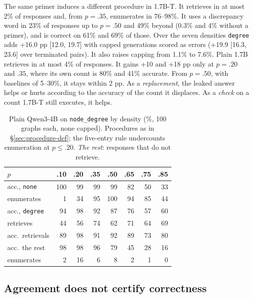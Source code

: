 \documentclass[11pt]{article}
\newcommand{\task}[1]{\texttt{#1}}
\newcommand{\cond}[1]{\texttt{#1}}
\begin{document}
The same primer induces a different procedure in 1.7B-T. It retrieves in at
most 2\% of responses and, from $p{=}.35$, enumerates in 76--98\%. It uses a
discrepancy word in 23\% of responses up to $p{=}.50$ and 49\% beyond (0.3\%
and 4\% without a primer), and is correct on 61\% and 69\% of those. Over the
seven densities \cond{degree} adds +16.0 pp [12.0, 19.7] with capped
generations scored as errors (+19.9 [16.3, 23.6] over terminated pairs). It
also raises capping from 1.1\% to 7.6\%. Plain 1.7B retrieves in at most 4\%
of responses. It gains +10 and +18 pp only at $p{=}.20$ and $.35$, where its
own count is 80\% and 41\% accurate. From $p{=}.50$, with baselines of
5--30\%, it stays within 2 pp. As a \emph{replacement}, the leaked answer
helps or hurts according to the accuracy of the count it displaces. As a
\emph{check} on a count 1.7B-T still executes, it helps.

\begin{table}[t]
\centering
\small
\setlength{\tabcolsep}{2.6pt}
\begin{tabular}{lrrrrrrr}
\toprule
$p$ & .10 & .20 & .35 & .50 & .65 & .75 & .85 \\
\midrule
acc., \cond{none}      & 100 & 99 & 99 & 99 & 82 & 50 & 33 \\
\quad enumerates       & 1 & 34 & 95 & 100 & 94 & 85 & 44 \\
acc., \cond{degree}    & 94 & 98 & 92 & 87 & 76 & 57 & 60 \\
\quad retrieves        & 44 & 56 & 74 & 62 & 71 & 64 & 69 \\
\quad acc.\ retrievals & 89 & 98 & 91 & 92 & 89 & 73 & 80 \\
\quad acc.\ the rest   & 98 & 98 & 96 & 79 & 45 & 28 & 16 \\
\quad enumerates       & 2 & 16 & 6 & 8 & 2 & 1 & 0 \\
\bottomrule
\end{tabular}
\caption{Plain Qwen3-4B on \task{node\_degree} by density (\%, 100 graphs
each, none capped). Procedures as in \S\ref{sec:procedure-def}; the five-entry
rule undercounts enumeration at $p\le.20$. \emph{The rest}: responses that
do not retrieve.}
\label{tab:procedure}
\end{table}

\subsection{Agreement does not certify correctness}
\label{sec:invariants}
\end{document}
